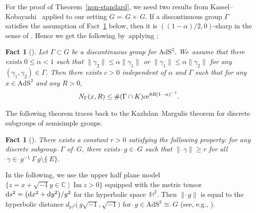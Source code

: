 \documentclass[pdftex]{sigma}
\numberwithin{equation}{section}
\newtheorem{Fact}[Theorem]{Fact}
 { \theoremstyle{definition}
\newtheorem{Definition}[Theorem]{Definition}
\newtheorem{Note}[Theorem]{Note}
\newtheorem{Example}[Theorem]{Example}
\newtheorem{Remark}[Theorem]{Remark}
\newtheorem{Setting}[Theorem]{Setting}
\newtheorem{Notation}[Theorem]{Notation}
}
\begin{document}
For the proof of Theorem~\ref{non-standard}, we need two results
from Kassel--Kobayashi~\cite{KaKob16} applied to our setting
$G=\grave{\ }G\times\grave{\ }G$.
If a discontinuous group
$\Gamma$ satisfies the assumption of Fact~\ref{alphacounting} below,
then it is $((1-\alpha)/2,0)$-sharp
in the sense of \cite[Definition~4.2]{KaKob16}.
Hence we get the following by~applying \cite[Lemma~4.6.4]{KaKob16}:
\begin{Fact}[\cite{KaKob16}]
\label{alphacounting}
Let $\Gamma \subset G$ be a discontinuous group for $\mathrm{AdS}^{3}$. We~assume that there exists $0\leq\alpha<1$ such that
$\|\gamma_2\|\leq\alpha\|\gamma_1\|$ or $\|\gamma_1\|\leq\alpha\|\gamma_2\|$
for any $(\gamma_1,\gamma_2)\in\Gamma$.
Then there exists $c>0$ independent of $\alpha$ and $\Gamma$
such that for any $x\in\mathrm{AdS}^3$ and any $R>0$,
\begin{gather*}
N_{\Gamma}(x,R)\leq \#(\Gamma\cap K)c{\rm e}^{8R(1-\alpha)^{-1}}.
\end{gather*}
\end{Fact}

The following theorem
traces back to the Kazhdan--Margulis theorem for discrete subgroups of
semisimple groups.
\begin{Fact}[{\cite[Proposition~8.14]{KaKob16}}]
\label{Kazhdan-Margulis}
There exists a constant $r>0$ satisfying the following property:
for any discrete subgroup $\grave{\ }\Gamma$ of $\grave{\ }G$,
there exists $\grave{\ }g \in \grave{\ }G$ such that
$\|\grave{\ }\gamma\|\geq r$ for all
$\grave{\ }\gamma\in
\grave{\ }g^{-1}\grave{\ }\Gamma \grave{\ }g\setminus\{\grave{\ }E\}$.
\end{Fact}

In the following, we use the upper half plane model
$\big\{z=x+\sqrt{-1}y\in\mathbb{C}\mid \operatorname{Im}z>0\big\}$
equipped with the metric tensor ${\rm d}s^2=\big({\rm d}x^2+{\rm d}y^2\big)/y^2$
for the hyperbolic space~$\mathbb{H}^2$.
Then $\|\grave{\ }g\|$ is equal to the hyperbolic distance
$d_{\mathbb{H}^{2}}\big(\grave{\ }g\sqrt{-1},\sqrt{-1}\big)$
for $\grave{\ }g\in\mathrm{AdS}^{3}\cong\grave{\ }G$ (see, e.g., \cite[equation~(A.1)]{GuKa17}).
\end{document}
